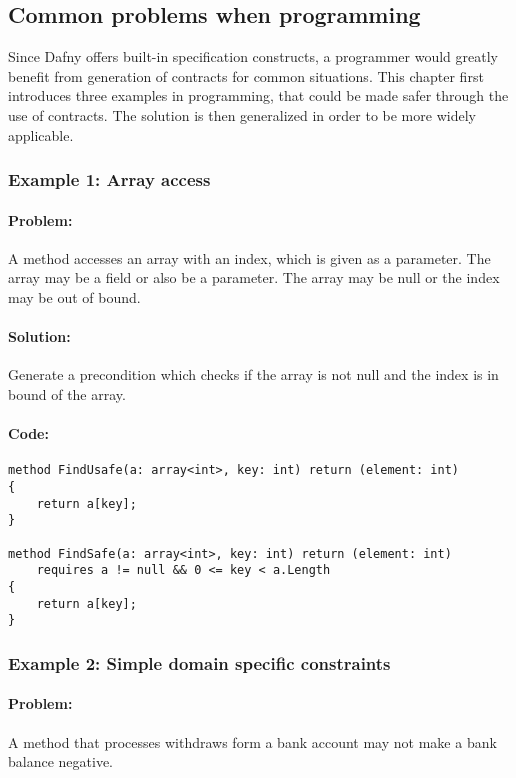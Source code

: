 \subsection{Common problems when programming} \label{examples}
Since Dafny offers built-in specification constructs, a programmer would greatly benefit from generation of contracts for common situations. This chapter first introduces three examples in programming, that could be made safer through the use of contracts. The solution is then generalized in order to be more widely applicable.
\subsubsection{Example 1: Array access} \label{Example 1}

\paragraph{Problem:}

A method accesses an array with an index, which is given as a parameter. The array may be a field or also be a parameter. The array may be null or the index may be out of bound.
\paragraph{Solution:}
Generate a precondition which checks if the array is not null and the index is in bound of the array.

\paragraph{Code:}
\begin{lstlisting}[language=dafny]
method FindUsafe(a: array<int>, key: int) return (element: int)
{
	return a[key];
}

method FindSafe(a: array<int>, key: int) return (element: int)
	requires a != null && 0 <= key < a.Length
{
	return a[key];
}
\end{lstlisting}



\subsubsection{Example 2: Simple domain specific constraints} \label{Example 2}
\paragraph{Problem:}
A method that processes withdraws form a bank account may not make a bank balance negative.
